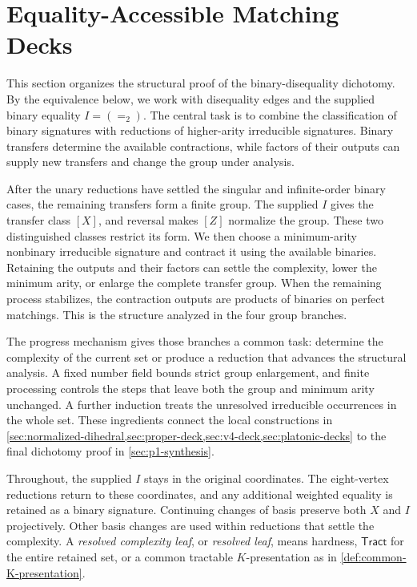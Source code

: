 \documentclass[11pt,letterpaper,onecolumn]{article}
\theoremstyle{plain}
\theoremstyle{definition}
\theoremstyle{remark}
\newcommand{\Tract}{\mathsf{Tract}}
\newcommand{\Eq}{=}
\begin{document}
\section{Equality-Accessible Matching Decks}
\label{sec:weighted-equality}
\label{sec:p1-binary-phase}

This section organizes the structural proof of the binary-disequality
dichotomy. By the equivalence below, we work with disequality edges and
the supplied binary equality \(I=(\Eq_2)\). The central task is to combine
the classification of binary signatures with reductions of higher-arity
irreducible signatures. Binary transfers determine the available
contractions, while factors of their outputs can supply new transfers
and change the group under analysis.

After the unary reductions have settled the singular and infinite-order
binary cases, the remaining transfers form a finite group. The supplied
\(I\) gives the transfer class \([X]\), and reversal makes \([Z]\)
normalize the group. These two distinguished classes restrict its form.
We then choose a minimum-arity nonbinary irreducible signature and
contract it using the available binaries. Retaining the outputs and their
factors can settle the complexity, lower the minimum arity, or
enlarge the complete transfer group. When the remaining process stabilizes, the
contraction outputs are products of binaries on perfect matchings.
This is the structure analyzed in the four group branches.

The progress mechanism gives those branches a common task: determine the
complexity of the current set or produce a reduction that advances the
structural analysis. A fixed number field bounds strict group enlargement,
and finite processing controls the steps that leave both the group and
minimum arity unchanged. A further induction treats the unresolved
irreducible occurrences in the whole set. These ingredients connect the
local constructions in \cref{sec:normalized-dihedral,sec:proper-deck,sec:v4-deck,sec:platonic-decks}
to the final dichotomy proof in \cref{sec:p1-synthesis}.

Throughout, the supplied \(I\) stays in the original coordinates.
The eight-vertex reductions return to these coordinates, and any additional
weighted equality is retained as a binary signature. Continuing changes
of basis preserve both \(X\) and \(I\) projectively. Other basis changes
are used within reductions that settle the complexity. A \emph{resolved
complexity leaf}, or \emph{resolved leaf}, means hardness,
\(\Tract\) for the entire retained set,
or a common tractable \(K\)-presentation as in
\cref{def:common-K-presentation}.
\end{document}
